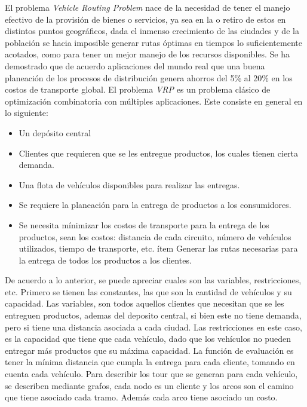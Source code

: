 \documentclass[letter, 10pt]{article}
\begin{document}
El problema \emph{Vehicle Routing Problem} nace de la necesidad de tener el manejo efectivo de la provisi\'on de bienes o servicios, ya sea en la
o retiro de estos en distintos puntos geogr\'aficos, dada el inmenso crecimiento de las ciudades y de la poblaci\'on se hacia imposible generar
rutas \'optimas en tiempos lo suficientemente acotados, como para tener un mejor manejo de los recursos disponibles. Se ha demostrado que de acuerdo
aplicaciones del mundo real que una buena planeaci\'on de los procesos de distribuci\'on genera ahorros del 5\% al 20\% en los costos de transporte
global.
\newline
El problema \emph{VRP} es un problema cl\'asico de optimizaci\'on combinatoria con m\'ultiples aplicaciones.
Este consiste en general en lo siguiente:
\begin{itemize}
 \item Un dep\'osito central
 \item Clientes que requieren que se les entregue productos, los cuales tienen cierta demanda.
 \item Una flota de veh\'iculos disponibles para realizar las entregas.
 \item Se requiere la planeaci\'on para la entrega de productos a los consumidores.
 \item Se necesita m\'inimizar los costos de transporte para la entrega de los productos, sean los costos: distancia de cada circuito, n\'umero de
 veh\'iculos utilizados, tiempo de transporte, etc.
 \'item Generar las rutas necesarias para la entrega de todos los productos a los clientes.
\end{itemize}
De acuerdo a lo anterior, se puede apreciar cuales son las variables, restricciones, etc.
Primero se tienen las constantes, las que son la cantidad de veh\'iculos y su capacidad.
Las variables, son todos aquellos clientes que necesitan que se les entreguen productos, ademas del deposito central, si bien este no tiene demanda, pero si tiene una distancia asociada a cada ciudad.
Las restricciones en este caso, es la capacidad que tiene que cada veh\'iculo, dado que los veh\'iculos no pueden entregar m\'as productos que su m\'axima capacidad.
La funci\'on de evaluaci\'on es tener la m\'inima distancia que cumpla la entrega para cada cliente, tomando en cuenta cada veh\'iculo.
\newline
Para describir los tour que se generan para cada veh\'iculo, se describen mediante grafos, cada nodo es un cliente y los arcos son el camino que 
tiene asociado cada tramo. Adem\'as cada arco tiene asociado un costo.
\newline
\end{document}
